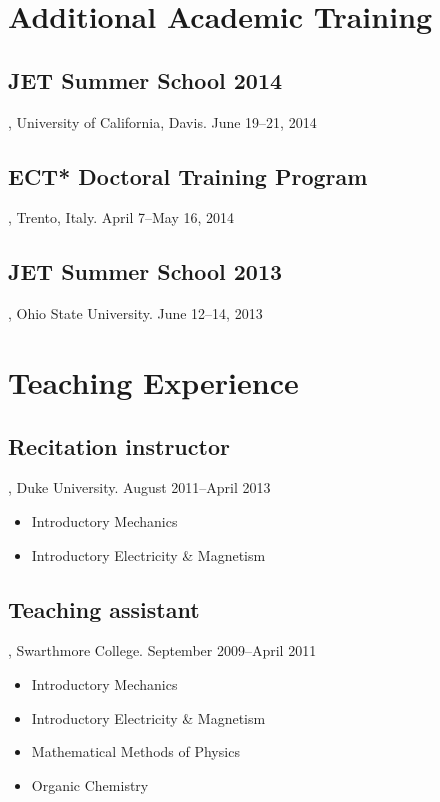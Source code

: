 \documentclass[letterpaper,10pt]{article}
\begin{document}
\section{Additional Academic Training}

\subsection{JET Summer School 2014}, University of California, Davis. \hfill June 19--21, 2014

\subsection{ECT* Doctoral Training Program}, Trento, Italy. \hfill April 7--May 16, 2014

\subsection{JET Summer School 2013}, Ohio State University. \hfill June 12--14, 2013



\section{Teaching Experience}

\subsection{Recitation instructor}, Duke University. \hfill August 2011--April 2013

\begin{itemize}
  \item Introductory Mechanics
  \item Introductory Electricity \& Magnetism
\end{itemize}


\subsection{Teaching assistant}, Swarthmore College. \hfill September 2009--April 2011

\begin{itemize}
  \item Introductory Mechanics
  \item Introductory Electricity \& Magnetism
  \item Mathematical Methods of Physics
  \item Organic Chemistry
\end{itemize}
\end{document}
